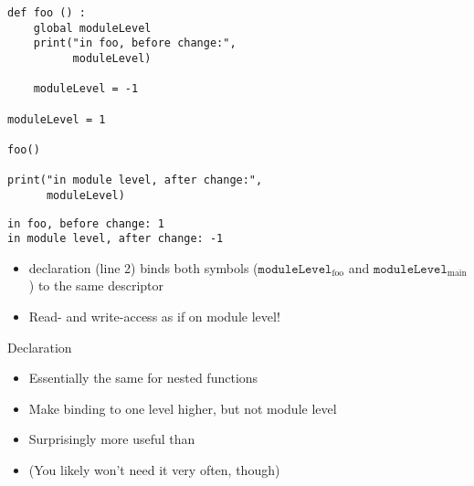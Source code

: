 
\begin{frame}[fragile]
%
\begin{tcbraster}[raster columns=2,
                  raster equal height,
                  nobeforeafter,
                  raster column skip=0.5cm]
\begin{codebox}
\begin{verbatim}
def foo () :
    global moduleLevel
    print("in foo, before change:",
          moduleLevel)
    
    moduleLevel = -1

moduleLevel = 1

foo()

print("in module level, after change:",
      moduleLevel)
\end{verbatim}
\end{codebox}
%
\begin{cmdbox}
\begin{verbatim}
in foo, before change: 1
in module level, after change: -1
\end{verbatim}
\end{cmdbox}
\end{tcbraster}
%
\begin{itemize}
\item {} declaration (line 2) binds both symbols ($\texttt{moduleLevel}_{\text{foo}}$ and $\texttt{moduleLevel}_{\text{main}}$) to the same descriptor
\item Read- and write-access as if on module level!
\end{itemize}
%
\end{frame}


\begin{frame}[fragile]{ Declaration}
%
\begin{itemize}
\item Essentially the same for nested functions
\item Make binding to one level higher, but not module level
\item Surprisingly more useful than 
\item (You likely won't need it very often, though)
\end{itemize}
%
\end{frame}


